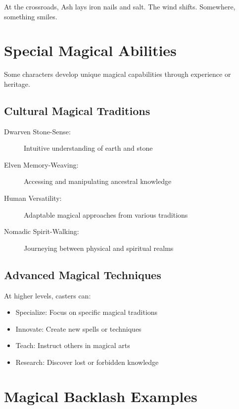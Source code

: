\documentclass[11pt,twoside,openany]{book}
\begin{document}
\begin{tcolorbox}[colback=gray!5!white, colframe=gray!75!black, title=Vignette, fonttitle=\bfseries,breakable]
At the crossroads, Ash lays iron nails and salt. The wind shifts. Somewhere, something smiles.
\end{tcolorbox}

\section*{Special Magical Abilities} 

Some characters develop unique magical capabilities through experience or heritage.

\subsection*{Cultural Magical Traditions}

\begin{description}
\item[Dwarven Stone-Sense:] Intuitive understanding of earth and stone
\item[Elven Memory-Weaving:] Accessing and manipulating ancestral knowledge
\item[Human Versatility:] Adaptable magical approaches from various traditions
\item[Nomadic Spirit-Walking:] Journeying between physical and spiritual realms
\end{description}

\subsection*{Advanced Magical Techniques}

At higher levels, casters can:
\begin{itemize}
\item Specialize: Focus on specific magical traditions
\item Innovate: Create new spells or techniques
\item Teach: Instruct others in magical arts
\item Research: Discover lost or forbidden knowledge
\end{itemize}

\section*{Magical Backlash Examples} 
\end{document}
